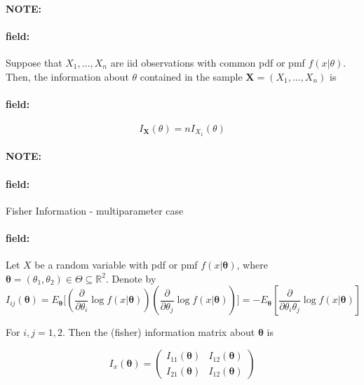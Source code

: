 \documentclass[12pt]{article}
\newenvironment{note}{\paragraph{NOTE:}}{}
\newenvironment{field}{\paragraph{field:}}{}
\begin{document}
\begin{note}
  \begin{field}
    Suppose that $X_1, \ldots , X_n$ are iid observations with common pdf or pmf $f(x|\theta)$. Then, the information about $\theta$ contained in the sample $\mathbf{X} = (X_1, \ldots , X_n)$ is
  \end{field}
  \begin{field}
    $$I_{\mathbf{X}}(\theta) = n I_{X_1}(\theta)$$
  \end{field}
\end{note}

\begin{note}
  \begin{field}
    Fisher Information - multiparameter case
  \end{field}
  \begin{field}
    Let $X$ be a random variable with pdf or pmf $f(x|\boldsymbol\theta)$, where $\boldsymbol\theta = (\theta_1,\theta_2) \in \Theta \subseteq \mathbb{R}^2$. Denote by $$I_{ij}(\boldsymbol\theta) = E_{\boldsymbol\theta}\big[(\frac{\partial}{\partial \theta_i}\log f(x|\boldsymbol\theta))(\frac{\partial}{\partial \theta_j} \log f(x|\boldsymbol\theta))\big] = -E_{\boldsymbol\theta}[\frac{\partial}{\partial \theta_i\theta_j}\log f(x|\boldsymbol\theta)]$$

    For $i,j = 1,2$.
    Then the (fisher) information matrix about $\boldsymbol\theta$ is

    $$ I_x(\boldsymbol\theta) = \begin{pmatrix}
      I_{11}(\boldsymbol\theta) & I_{12}(\boldsymbol\theta)\\
      I_{21}(\boldsymbol\theta) & I_{12}(\boldsymbol\theta)
    \end{pmatrix}$$
  \end{field}
\end{note}
\end{document}

